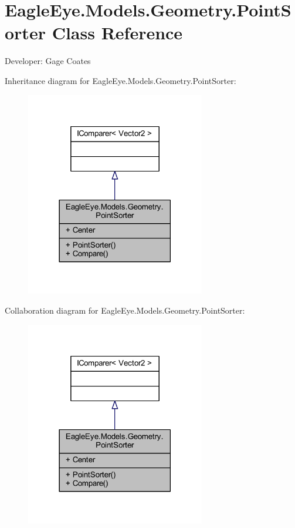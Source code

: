\hypertarget{class_eagle_eye_1_1_models_1_1_geometry_1_1_point_sorter}{}\section{Eagle\+Eye.\+Models.\+Geometry.\+Point\+Sorter Class Reference}
\label{class_eagle_eye_1_1_models_1_1_geometry_1_1_point_sorter}


Developer\+: Gage Coates  




Inheritance diagram for Eagle\+Eye.\+Models.\+Geometry.\+Point\+Sorter\+:\nopagebreak
\begin{figure}[H]
\begin{center}
\leavevmode
\includegraphics[width=222pt]{class_eagle_eye_1_1_models_1_1_geometry_1_1_point_sorter__inherit__graph}
\end{center}
\end{figure}


Collaboration diagram for Eagle\+Eye.\+Models.\+Geometry.\+Point\+Sorter\+:\nopagebreak
\begin{figure}[H]
\begin{center}
\leavevmode
\includegraphics[width=222pt]{class_eagle_eye_1_1_models_1_1_geometry_1_1_point_sorter__coll__graph}
\end{center}
\end{figure}
